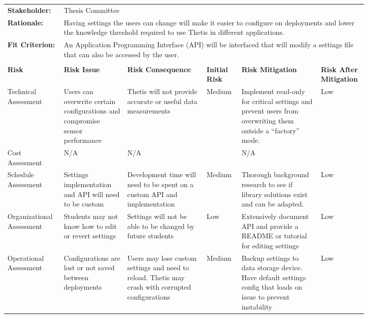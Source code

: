 \begin{landscape}
{\begin{longtable}{| p{0.12\linewidth} | p{0.16\linewidth} |  p{0.20\linewidth} | p{0.08\linewidth} | p{0.20\linewidth} | p{0.08\linewidth} |}
	\hline
	\rowcolor[gray]{0.8}
	\multicolumn{6}{|c|}{ } \\
	\hline
	\textbf{Stakeholder:} & \multicolumn{5}{|l|}{Thesis Committee} \\
	\hline
	\textbf{Rationale:} & \multicolumn{5}{|p{0.8\linewidth}|}{Having settings the users can change will make it easier to configure on deployments and lower the knowledge threshold required to use Thetis in different applications.} \\
	\hline
	\textbf{Fit Criterion:} & \multicolumn{5}{|p{0.8\linewidth}|}{An Application Programming Interface (API) will be interfaced that will modify a settings file that can also be accessed by the user.} \\
	\hline
	\rowcolor[gray]{0.8}
	\multicolumn{6}{|c|}{ } \\
	\hline
	\textbf{Risk} & \textbf{Risk Issue} & \textbf{Risk Consequence} & \textbf{Initial Risk} & \textbf{Risk Mitigation} & \textbf{Risk \newline After \newline Mitigation} \\
	\hline
	Technical \newline Assessment & Users can overwrite certain configurations and compromise sensor performance & Thetis will not provide accurate or useful data measurements  & \cellcolor{yellow} Medium & Implement read-only for critical settings and prevent users from overwriting them outside a ``factory'' mode. & \cellcolor{green} Low \\
	\hline
	Cost \newline Assessment & N/A & N/A & \cellcolor[gray]{0.8} & N/A & \cellcolor[gray]{0.8} \\
	\hline
	Schedule \newline Assessment & Settings implementation and API will need to be custom & Development time will need to be spent on a custom API and implementation & \cellcolor{yellow} Medium & Thorough background research to see if library solutions exist and can be adapted. & \cellcolor{green} Low \\
	\hline
	Organizational \newline Assessment & Students may not know how to edit or revert settings & Settings will not be able to be changed by future students & \cellcolor{green} Low & Extensively document API and provide a README or tutorial for editing settings & \cellcolor{green} Low \\
	\hline
	Operational \newline Assessment & Configurations are lost or not saved between deployments & Users may lose custom settings and need to reload. \newline Thetis may crash with corrupted configurations  & \cellcolor{yellow} Medium & Backup settings to data storage device. \newline Have default settings config that loads on issue to prevent instability & \cellcolor{green} Low
	\label{tab:sr07_feasibility}
\end{longtable}
}
\newpage



\end{landscape}
